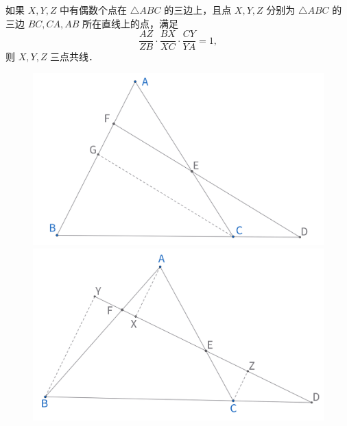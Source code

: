 \begin{theorem}
如果 $X ,  Y ,  Z$ 中有偶数个点在 $\triangle A B C$ 的三边上，且点 $X ,  Y ,  Z$ 分别为 $\triangle A B C$ 的三边 $B C ,  C A ,  A B$ 所在直线上的点，满足 
$$\frac{A Z}{Z B} \cdot \frac{B X}{X C} \cdot \frac{C Y}{Y A}=1,$$
则 $X ,  Y ,  Z$ 三点共线．
\end{theorem}



\begin{figure}[H]
    \centering
    \hfill %
    \begin{minipage}[t]{0.45\textwidth}
        \centering
        \includegraphics[width=\linewidth]{figures/menelaus-proof1.png}
    \end{minipage}
    \hfill %
    \begin{minipage}[t]{0.45\textwidth}
    \centering
    \includegraphics[width=\linewidth]{figures/menelaus-proof2.png}
    \end{minipage}
\end{figure}

